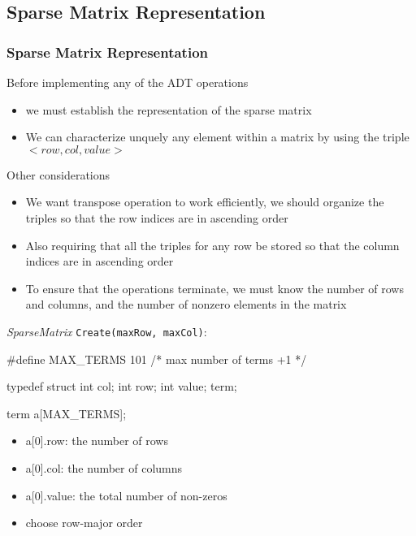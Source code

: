 \documentclass[newPxFont,sthlmFooter,nooffset]{beamer}
\begin{document}
\subsection{Sparse Matrix Representation}

\begin{frame}
  \frametitle{Sparse Matrix Representation}
Before implementing any of the ADT operations
\begin{itemize}
  \item we must establish the representation of the sparse matrix
  \item We can characterize unquely any element within a matrix by using the triple $<row, col, value>$
\end{itemize}

Other considerations
\begin{itemize}
  \item We want transpose operation to work efficiently, we should organize the triples so that the row indices are in ascending order
  \item Also requiring that all the triples for any row be stored so that the column indices are in ascending order
  \item To ensure that the operations terminate, we must know the number of rows and columns, and the number of nonzero elements in the matrix
\end{itemize}


\framebreak

\textit{SparseMatrix} \texttt{Create(maxRow, maxCol)}:

\begin{codedef}
#define MAX_TERMS 101  /* max number of terms +1 */

typedef struct {
    int col; 
    int row; 
    int value;
} term;

term a[MAX_TERMS];  
\end{codedef}

\begin{itemize}
\item a[0].row: the number of rows
\item a[0].col: the number of columns
\item a[0].value: the total number of non-zeros
\item choose row-major order
\end{itemize}

\framebreak


\end{frame}
\end{document}
